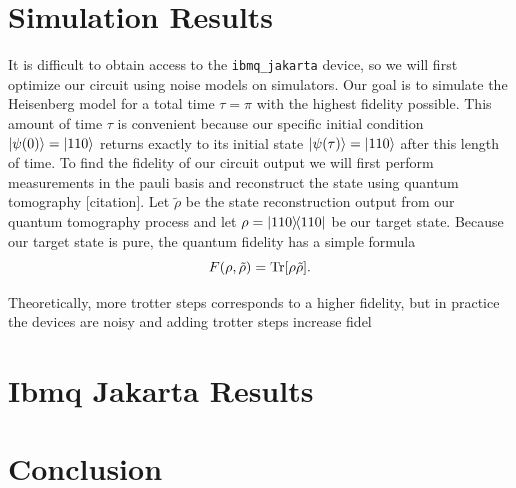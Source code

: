 \documentclass[aps,prl, reprint]{revtex4-2}
\begin{document}
\section{Simulation Results}

It is difficult to obtain access to the \texttt{ibmq\_jakarta} device, so we will first optimize our circuit using noise models on simulators. Our goal is to simulate the Heisenberg model for a total time $\tau=\pi$ with the highest fidelity possible. This amount of time $\tau$ is convenient because our specific initial condition $\ket{\psi(0)}=\ket{110}$ returns exactly to its initial state $\ket{\psi(\tau)}=\ket{110}$ after this length of time. To find the fidelity of our circuit output we will first perform measurements in the pauli basis and reconstruct the state using quantum tomography [citation]. Let $\tilde{\rho}$ be the state reconstruction output from our quantum tomography process and let $\rho = \dyad{110}$ be our target state. Because our target state is pure, the quantum fidelity has a simple formula
\begin{equation}
F(\rho, \tilde{\rho}) = \Tr[\rho\tilde{\rho}].
\end{equation}

 Theoretically, more trotter steps corresponds to a higher fidelity, but in practice the devices are noisy and adding trotter steps increase fidel 

\section{Ibmq Jakarta Results}

\section{Conclusion}


\end{document}
